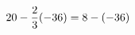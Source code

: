 \documentclass[preview]{standalone}
\begin{document}
\begin{align*}
\special{dvisvgm:raw <g id='unique000'>}20 - \frac{2}{3} (-36) = 8 - (-36)\special{dvisvgm:raw </g>}
\end{align*}
\end{document}
